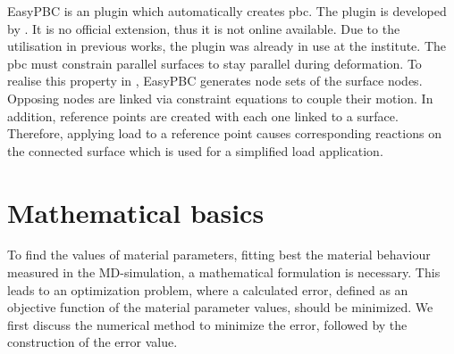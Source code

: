 EasyPBC is an  plugin which automatically creates \acrshort{pbc}. The plugin is developed by \citet{omairey_development_2019}. It is no official  extension, thus it is not online available. Due to the utilisation in previous works, the plugin was already in use at the institute. The \acrshort{pbc} must constrain parallel surfaces to stay parallel during deformation. To realise this property in , EasyPBC generates node sets of the surface nodes. Opposing nodes are linked via constraint equations to couple their motion. In addition, reference points are created with each one linked to a surface. Therefore, applying load to a reference point causes corresponding reactions on the connected surface which is used for a simplified load application. 








\section{Mathematical basics} \label{sec: mathematics}

To find the values of material parameters, fitting best the material behaviour measured in the MD-simulation, a mathematical formulation is necessary. This leads to an optimization problem, where a calculated error, defined as an objective function of the material parameter values, should be minimized. We first discuss the numerical method to minimize the error, followed by the construction of the error value.

